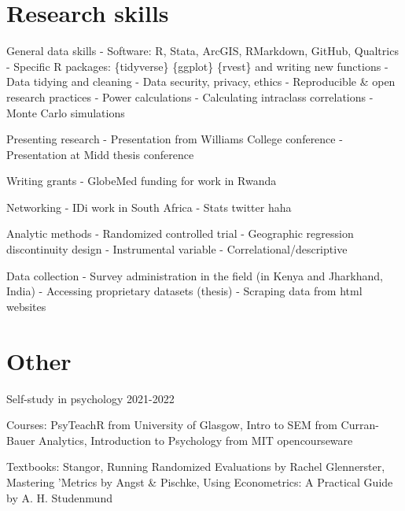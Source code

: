 \documentclass[11pt,]{article}
\renewenvironment{itemize}{
  \begin{list}{}{
    \setlength{\leftmargin}{1.5em}
  }
}{
  \end{list}
}
\begin{document}
\hypertarget{research-skills}{%
\section{Research skills}\label{research-skills}}

General data skills - Software: R, Stata, ArcGIS, RMarkdown, GitHub,
Qualtrics - Specific R packages: \{tidyverse\} \{ggplot\} \{rvest\} and
writing new functions - Data tidying and cleaning - Data security,
privacy, ethics - Reproducible \& open research practices - Power
calculations - Calculating intraclass correlations - Monte Carlo
simulations

Presenting research - Presentation from Williams College conference -
Presentation at Midd thesis conference

Writing grants - GlobeMed funding for work in Rwanda

Networking - IDi work in South Africa - Stats twitter haha

Analytic methods - Randomized controlled trial - Geographic regression
discontinuity design - Instrumental variable - Correlational/descriptive

Data collection - Survey administration in the field (in Kenya and
Jharkhand, India) - Accessing proprietary datasets (thesis) - Scraping
data from html websites

\hypertarget{other}{%
\section{Other}\label{other}}

Self-study in psychology \hfill 2021-2022

\begin{itemize}
\item
  Courses: PsyTeachR from University of Glasgow, Intro to SEM from
  Curran-Bauer Analytics, Introduction to Psychology from MIT
  opencourseware
\item
  Textbooks: Stangor, Running Randomized Evaluations by Rachel
  Glennerster, Mastering 'Metrics by Angst \& Pischke, Using
  Econometrics: A Practical Guide by A. H. Studenmund
\end{itemize}
\end{document}
